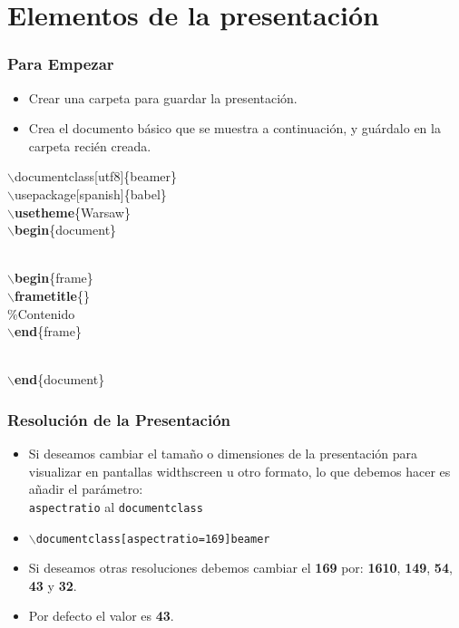 \documentclass[aspectratio=1610]{beamer}%
\newcommand\azul[1]{\textcolor[RGB]{19,15,204}{#1}}
\newcommand\verde[1]{\textcolor[RGB]{52,178,51}{#1}}
\begin{document}
\section{Elementos de la presentación}
\begin{frame}[fragile]
\frametitle{\textbf{Para Empezar}}
\justifying
 \begin{itemize}\justifying
  \item Crear una carpeta para guardar la presentación.
  \item Crea el documento básico que se muestra a continuación, y guárdalo en la carpeta recién creada.
\end{itemize}

$\backslash$\azul{documentclass}[utf8]\{beamer\}\\
$\backslash$\azul{usepackage}[spanish]\{babel\}\\
$\backslash$\textbf{usetheme}\{Warsaw\}\\
$\backslash$\textbf{begin}\{document\}\\\

$\backslash$\textbf{begin}\{frame\}\\
$\backslash$\textbf{frametitle}\{\}\\
\verde{\%Contenido}\\
$\backslash$\textbf{end}\{frame\}\\\

$\backslash$\textbf{end}\{document\}\\
\end{frame}

\begin{frame}[fragile]
\frametitle{\textbf{Resolución de la Presentación}}
\justifying
\begin{itemize}\justifying
  \item  Si deseamos cambiar el tamaño o dimensiones de la presentación para visualizar en pantallas widthscreen u otro formato, lo que debemos hacer es añadir el parámetro:\\ \texttt{aspectratio} al \texttt{documentclass}
  \item \texttt{$\backslash$documentclass[aspectratio=169]{beamer}}
  \item Si deseamos otras resoluciones debemos cambiar el \textbf{169} por: \textbf{1610}, \textbf{149}, \textbf{54}, \textbf{43} y \textbf{32}.
  \item Por defecto el valor es \textbf{43}.
\end{itemize}

\end{frame}
\end{document}

